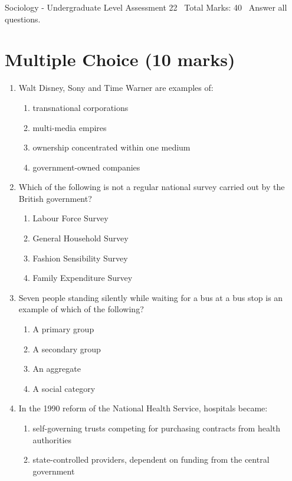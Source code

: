 \documentclass[12pt]{article}
\begin{document}
\begin{center}
Sociology - Undergraduate Level Assessment 22 \
Total Marks: 40 \
Answer all questions.
\end{center}

\section*{Multiple Choice (10 marks)}
\begin{enumerate}[label=\arabic*.]
\item Walt Disney, Sony and Time Warner are examples of:
\begin{enumerate}[label=(\alph*)]
    \item transnational corporations
    \item multi-media empires
    \item ownership concentrated within one medium
    \item government-owned companies
\end{enumerate}
\item Which of the following is not a regular national survey carried out by the British government?
\begin{enumerate}[label=(\alph*)]
    \item Labour Force Survey
    \item General Household Survey
    \item Fashion Sensibility Survey
    \item Family Expenditure Survey
\end{enumerate}
\item Seven people standing silently while waiting for a bus at a bus stop is an example of which of the following?
\begin{enumerate}[label=(\alph*)]
    \item A primary group
    \item A secondary group
    \item An aggregate
    \item A social category
\end{enumerate}
\item In the 1990 reform of the National Health Service, hospitals became:
\begin{enumerate}[label=(\alph*)]
    \item self-governing trusts competing for purchasing contracts from health authorities
    \item state-controlled providers, dependent on funding from the central government

\end{enumerate}
\end{enumerate}
\end{document}
